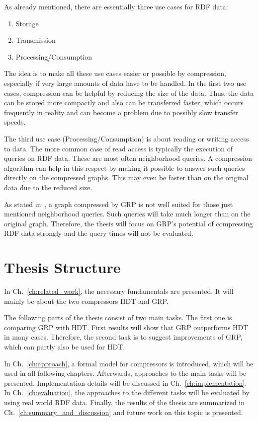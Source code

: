 As already mentioned, there are essentially three use cases for RDF data:

\begin{enumerate}
	\item Storage
	\item Transmission
	\item Processing/Consumption
\end{enumerate}

The idea is to make all these use cases easier or possible by compression, especially if very large amounts of data have to be handled. In the first two use cases, compression can be helpful by reducing the size of the data. Thus, the data can be stored more compactly and also can be transferred faster, which occurs frequently in reality and can become a problem due to possibly slow transfer speeds.

The third use case (Processing/Consumption) is about reading or writing access to data. The more common case of read access is typically the execution of queries on RDF data. These are most often neighborhood queries. A compression algorithm can help in this respect by making it possible to answer such queries directly on the compressed graphs. This may even be faster than on the original data due to the reduced size.

As stated in~\cite{maneth}, a graph compressed by GRP is not well suited for those just mentioned neighborhood queries. Such queries will take much longer than on the original graph. Therefore, the thesis will focus on GRP's potential of compressing RDF data strongly and the query times will not be evaluated.



\section{Thesis Structure}

In Ch.~\ref{ch:related_work}, the necessary fundamentals are presented. It will mainly be about the two compressors HDT and GRP. 

The following parts of the thesis consist of two main tasks. The first one is comparing GRP with HDT. First results will show that GRP outperforms HDT in many cases. Therefore, the second task is to suggest improvements of GRP, which can partly also be used for HDT.

In Ch.~\ref{ch:approach}, a formal model for compressors is introduced, which will be used in all following chapters. Afterwards, approaches to the main tasks will be presented. Implementation details will be discussed in Ch.~\ref{ch:implementation}. In Ch.~\ref{ch:evaluation}, the approaches to the different tasks will be evaluated by using real world RDF data. Finally, the results of the thesis are summarized in Ch.~\ref{ch:summary_and_discussion} and future work on this topic is presented.








